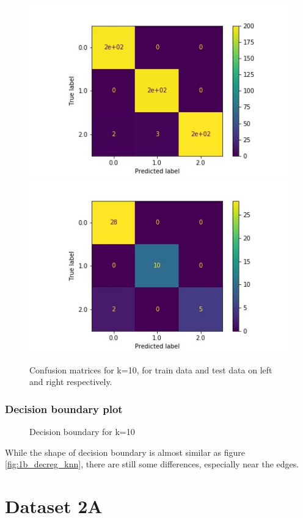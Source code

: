 \documentclass[11pt,a4paper]{article}
\begin{document}
\begin{figure}[H]
    \centering
    \includegraphics[scale=0.5]{images/1b_cm_nb_train.jpg}
    \includegraphics[scale=0.5]{images/1b_cm_nb_test.jpg}
    \caption{Confusion matrices for k=10, for train data and test data on left and right respectively.}
    \label{fig:1b_cm_nb}
\end{figure}

\subsubsection{Decision boundary plot}
\begin{figure}[H]
    \centering
    \caption{Decision boundary for k=10}
    \label{fig:1b_decreg_nb}
\end{figure}
While the shape of decision boundary is almost similar as figure \ref{fig:1b_decreg_knn}, there are still some differences, especially near the edges.

\break
\section{Dataset 2A}
\end{document}
